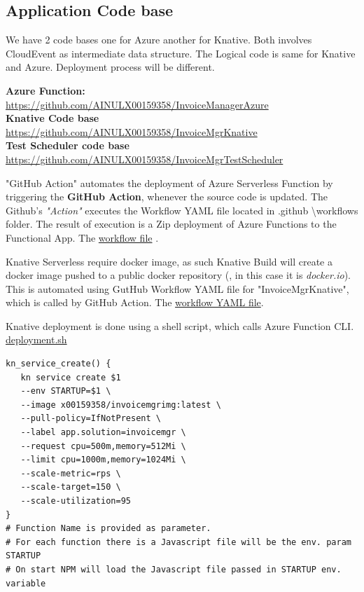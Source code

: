 \documentclass{article}
\begin{document}
\begin{flushleft}
\subsection{Application Code base}
We have 2 code bases one for Azure another for Knative. Both involves CloudEvent as intermediate data structure. The Logical code is same for Knative and Azure. Deployment process will be different.
\par
\textbf{Azure Function:}\\
\url{https://github.com/AINULX00159358/InvoiceManagerAzure} \\
\textbf{Knative Code base}\\ 
\url{https://github.com/AINULX00159358/InvoiceMgrKnative}\\
\textbf{Test Scheduler code base}\\ \url{https://github.com/AINULX00159358/InvoiceMgrTestScheduler} 

\par
"GitHub Action" automates the deployment of Azure Serverless Function by triggering the \textbf{GitHub Action}, whenever the source code is updated. The Github's \textit{"Action"} executes the Workflow YAML file located in .github \textbackslash workflows folder. The result of execution is a Zip deployment of Azure Functions to the Functional App. The \href{https://github.com/AINULX00159358/InvoiceManagerAzure/blob/main/.github/workflows/main_invoicemgrapp.yml}{workflow file} .

\par
Knative Serverless require docker image, as such Knative Build will create a docker image pushed to a public docker repository (, in this case it is \textit{docker.io}). This is automated using GutHub Workflow YAML file for "InvoiceMgrKnative", which is called by GitHub Action. The \href{https://github.com/AINULX00159358/InvoiceMgrKnative/blob/main/.github/workflows/buildAndPush.yml}{workflow YAML file}. 
\par
Knative deployment is done using a shell script, which calls Azure Function CLI. \href{https://github.com/AINULX00159358/InvoiceMgrKnative/blob/main/deployment.sh}{deployment.sh}

\begin{verbatim}
kn_service_create() {
   kn service create $1 
   --env STARTUP=$1 \  
   --image x00159358/invoicemgrimg:latest \  
   --pull-policy=IfNotPresent \
   --label app.solution=invoicemgr \
   --request cpu=500m,memory=512Mi \
   --limit cpu=1000m,memory=1024Mi \
   --scale-metric=rps \
   --scale-target=150 \
   --scale-utilization=95
}
# Function Name is provided as parameter.
# For each function there is a Javascript file will be the env. param STARTUP
# On start NPM will load the Javascript file passed in STARTUP env. variable
\end{verbatim}


\end{flushleft}
\end{document}
